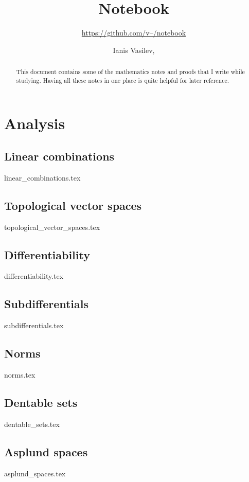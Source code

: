 \documentclass[numbers=endperiod, bibliography=totocnumbered]{scrartcl}
\title{Notebook}
\subtitle{\href{https://github.com/v--/notebook}{https://github.com/v--/notebook}}
\author{Ianis Vasilev, \Email{ianis@ivasilev.net}}
\date{}
\begin{document}
\sloppy

\maketitle

\begin{abstract}
  This document contains some of the mathematics notes and proofs that I write while studying. Having all these notes in one place is quite helpful for later reference.
\end{abstract}

\tableofcontents

\section{Analysis}\label{sec:analysis}
\subsection{Linear combinations}\label{sec:linear_combinations}
{linear_combinations.tex}
\subsection{Topological vector spaces}\label{sec:topological_vector_spaces}
{topological_vector_spaces.tex}
\subsection{Differentiability}\label{sec:differentiability}
{differentiability.tex}
\subsection{Subdifferentials}\label{sec:subdifferentials}
{subdifferentials.tex}
\subsection{Norms}\label{sec:norms}
{norms.tex}
\subsection{Dentable sets}\label{sec:dentable_sets}
{dentable_sets.tex}
\subsection{Asplund spaces}\label{sec:asplund_spaces}
{asplund_spaces.tex}
\end{document}
